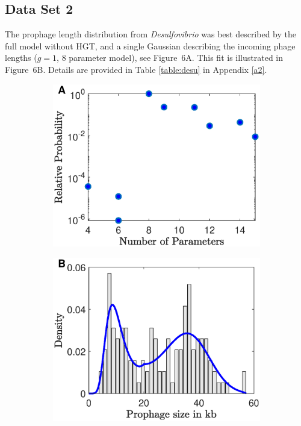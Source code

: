 \subsection{Data Set 2} 
The prophage length distribution from {\it Desulfovibrio} was best described by the full model without HGT, and a single Gaussian describing the incoming phage lengths ($g=1$, 8 parameter model), see Figure~6A.
This fit is illustrated in Figure~6B. Details are provided in Table \ref{table:desu} in Appendix \ref{a2}. 
\begin{figure}[H]
 \begin{subfigure}[t]{0.5\textwidth}
\centering
\includegraphics[scale=0.5]{desu_rel.eps}
\end{subfigure}\hfill
\begin{subfigure}[t]{0.5\textwidth}
\includegraphics[scale=0.5]{desu_best_pdf.eps}

\end{subfigure}
\end{figure}
